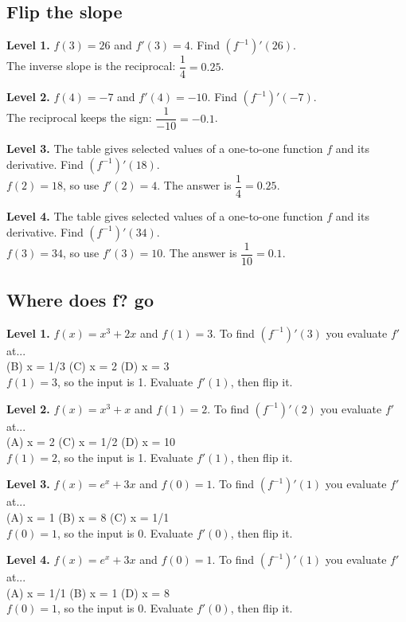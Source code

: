 \documentclass[11pt]{article}
\begin{document}
\subsection*{Flip the slope}
\noindent\textbf{Level 1.} $f(3)=26$ and $f'(3)=4$. Find $(f^{-1})'(26)$.\\  \quad The inverse slope is the reciprocal: $\dfrac1{4}=0.25$.\par\medskip
\noindent\textbf{Level 2.} $f(4)=-7$ and $f'(4)=-10$. Find $(f^{-1})'(-7)$.\\  \quad The reciprocal keeps the sign: $\dfrac1{-10}=-0.1$.\par\medskip
\noindent\textbf{Level 3.} The table gives selected values of a one-to-one function $f$ and its derivative. Find $(f^{-1})'(18)$.\\  \quad $f(2)=18$, so use $f'(2)=4$. The answer is $\dfrac1{4}=0.25$.\par\medskip
\noindent\textbf{Level 4.} The table gives selected values of a one-to-one function $f$ and its derivative. Find $(f^{-1})'(34)$.\\  \quad $f(3)=34$, so use $f'(3)=10$. The answer is $\dfrac1{10}=0.1$.\par\medskip
\subsection*{Where does f? go}
\noindent\textbf{Level 1.} $f(x)=x^{3}+2x$ and $f(1)=3$. To find $(f^{-1})'(3)$ you evaluate $f'$ at...\\  \quad (B) x = 1/3 \quad (C) x = 2 \quad (D) x = 3\\  \quad $f(1)=3$, so the input is 1. Evaluate $f'(1)$, then flip it.\par\medskip
\noindent\textbf{Level 2.} $f(x)=x^{3}+x$ and $f(1)=2$. To find $(f^{-1})'(2)$ you evaluate $f'$ at...\\ (A) x = 2 \quad {} \quad (C) x = 1/2 \quad (D) x = 10\\  \quad $f(1)=2$, so the input is 1. Evaluate $f'(1)$, then flip it.\par\medskip
\noindent\textbf{Level 3.} $f(x)=e^{x}+3x$ and $f(0)=1$. To find $(f^{-1})'(1)$ you evaluate $f'$ at...\\ (A) x = 1 \quad (B) x = 8 \quad (C) x = 1/1 \quad {}\\  \quad $f(0)=1$, so the input is 0. Evaluate $f'(0)$, then flip it.\par\medskip
\noindent\textbf{Level 4.} $f(x)=e^{x}+3x$ and $f(0)=1$. To find $(f^{-1})'(1)$ you evaluate $f'$ at...\\ (A) x = 1/1 \quad (B) x = 1 \quad {} \quad (D) x = 8\\  \quad $f(0)=1$, so the input is 0. Evaluate $f'(0)$, then flip it.\par\medskip
\end{document}
